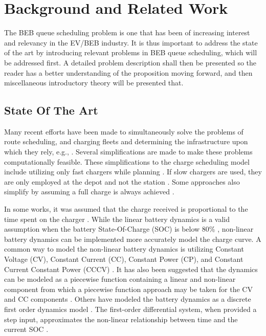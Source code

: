 \documentclass[ee,msthesis]{usuthesis}
\begin{document}
\chapter{Background and Related Work}
\label{sec:background-and-related-work}
The BEB queue scheduling problem is one that has been of increasing interest and relevancy in the EV/BEB industry. It is
thus important to address the state of the art by introducing relevant problems in BEB queue scheduling, which will be
addressed first. A detailed problem description shall then be presented so the reader has a better understanding of the
proposition moving forward, and then miscellaneous introductory theory will be presented that.

\section{State Of The Art}
\label{sec:state-of-the-art}
Many recent efforts have been made to simultaneously solve the problems of route scheduling, and charging fleets and
determining the infrastructure upon which they rely, e.g., \cite{wei-2018-optim-spatio,sebastiani-2016-evaluat-elect,hoke-2014-accoun-lithium,wang-2017-elect-vehic}. Several simplifications are made to make these problems
computationally feasible. These simplifications to the charge scheduling model include utilizing only fast chargers
while planning \cite{wei-2018-optim-spatio,sebastiani-2016-evaluat-elect,wang-2017-optim-rechar,zhou-2020-bi-objec,yang-2018-charg-sched,wang-2017-elect-vehic,qin-2016-numer-analy,liu-2020-batter-elect}. If slow chargers are used,
they are only employed at the depot and not the station \cite{he-2020-optim-charg,tang-2019-robus-sched}. Some
approaches also simplify by assuming a full charge is always achieved
\cite{wei-2018-optim-spatio,wang-2017-elect-vehic,zhou-2020-bi-objec,wang-2017-optim-rechar}.

In some works, it was assumed that the charge received is proportional to the time spent on the charger
\cite{liu-2020-batter-elect,yang-2018-charg-sched}. While the linear battery dynamics is a valid assumption when the
battery State-Of-Charge (SOC) is below 80\% \cite{liu-2020-batter-elect}, non-linear battery dynamics can be implemented
more accurately model the charge curve. A common way to model the non-linear battery dynamics is utilizing Constant
Voltage (CV), Constant Current (CC), Constant Power (CP), and Constant Current Constant Power (CCCV)
\cite{abdollahi-2016-optim-batter,chen-2008-desig-grey}. It has also been suggested that the dynamics can be modeled
as a piecewise function containing a linear and non-linear component from which a piecewise function approach may be
taken for the CV and CC components \cite{zhang-2021-optim-elect,abdollahi-2016-optim-batter}. Others have modeled the
battery dynamics as a discrete first order dynamics model \cite{whitaker-2022-a-network}. The first-order differential
system, when provided a step input, approximates the non-linear relationship between time and the current SOC
\cite{whitaker-2022-a-network}.
\end{document}
